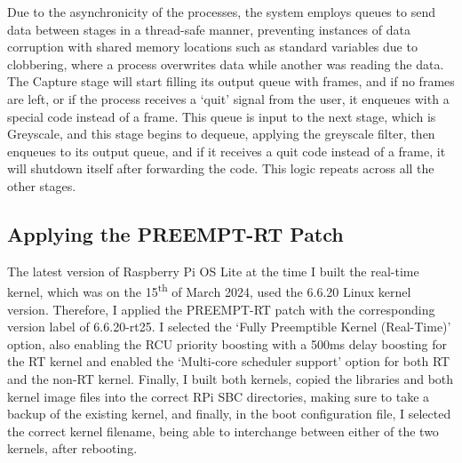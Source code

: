 Due to the asynchronicity of the processes, the system employs queues to send data between stages in a thread-safe manner, preventing instances of data corruption with shared memory locations such as standard variables due to clobbering, where a process overwrites data while another was reading the data. The Capture stage will start filling its output queue with frames, and if no frames are left, or if the process receives a `quit' signal from the user, it enqueues with a special code instead of a frame. This queue is input to the next stage, which is Greyscale, and this stage begins to dequeue, applying the greyscale filter, then enqueues to its output queue, and if it receives a quit code instead of a frame, it will shutdown itself after forwarding the code. This logic repeats across all the other stages.

\subsection{Applying the PREEMPT-RT Patch}

The latest version of Raspberry Pi OS Lite at the time I built the real-time kernel, which was on the 15\textsuperscript{th} of March 2024, used the 6.6.20 Linux kernel version. Therefore, I applied the PREEMPT-RT patch with the corresponding version label of 6.6.20-rt25. I selected the `Fully Preemptible Kernel (Real-Time)' option, also enabling the RCU priority boosting with a 500ms delay boosting for the RT kernel and enabled the `Multi-core scheduler support' option for both RT and the non-RT kernel. Finally, I built both kernels, copied the libraries and both kernel image files into the correct RPi SBC directories, making sure to take a backup of the existing kernel, and finally, in the boot configuration file, I selected the correct kernel filename, being able to interchange between either of the two kernels, after rebooting.
